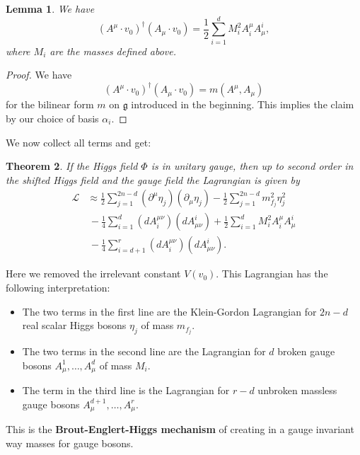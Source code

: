 \documentclass[12pt]{amsart}
\newtheorem{thm}{Theorem}[section]
\newtheorem{lem}[thm]{Lemma}
\theoremstyle{definition}
\theoremstyle{remark}
\numberwithin{equation}{section}
\begin{document}
\begin{lem}We have 
\begin{equation*}
\left(A^\mu\cdot v_0\right)^\dagger\left(A_\mu\cdot v_0\right)=\frac{1}{2}\sum_{i=1}^dM_i^2A_i^\mu A^i_\mu,
\end{equation*}
where $M_i$ are the masses defined above.
\end{lem}
\begin{proof}
We have 
\begin{equation*}
\left(A^\mu\cdot v_0\right)^\dagger\left(A_\mu\cdot v_0\right)=m(A^\mu,A_\mu)
\end{equation*}
for the bilinear form $m$ on $\mathfrak{g}$ introduced in the beginning. This implies the claim by our choice of basis $\alpha_i$.
\end{proof}
We now collect all terms and get:
\begin{thm}\label{thm combined Lag simply} If the Higgs field $\Phi$ is in unitary gauge, then up to second order in the shifted Higgs field and the gauge field the Lagrangian is given by 
\begin{align*}
\mathcal{L}&\approx\frac{1}{2}\sum_{j=1}^{2n-d}\left(\partial^\mu\eta_j\right)\left(\partial_\mu\eta_j\right)-\frac{1}{2}\sum_{j=1}^{2n-d}m_{f_j}^2\eta_j^2\\
&\,-\frac{1}{4}\sum_{i=1}^d\left(dA_i^{\mu\nu}\right)\left(dA^i_{\mu\nu}\right)+\frac{1}{2}\sum_{i=1}^dM_i^2A_i^\mu A^i_\mu\\
&\,-\frac{1}{4}\sum_{i=d+1}^r\left(dA_i^{\mu\nu}\right)\left(dA^i_{\mu\nu}\right).
\end{align*}
\end{thm}
Here we removed the irrelevant constant $V(v_0)$. This Lagrangian has the following interpretation:
\begin{itemize}
\item The two terms in the first line are the Klein-Gordon Lagrangian for $2n-d$ real scalar Higgs bosons $\eta_j$ of mass $m_{f_j}$.
\item The two terms in the second line are the Lagrangian for $d$ broken gauge bosons $A_\mu^1,\ldots,A_\mu^d$ of mass $M_i$.
\item The term in the third line is the Lagrangian for $r-d$ unbroken massless gauge bosons $A_\mu^{d+1},\ldots,A_\mu^r$.
\end{itemize}
This is the {\bf Brout-Englert-Higgs mechanism} of creating in a gauge invariant way masses for gauge bosons.
\end{document}
